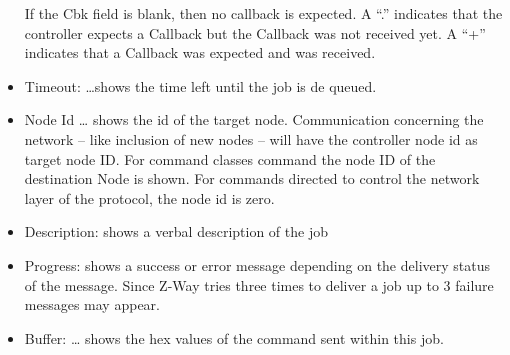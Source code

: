 \begin{itemize}
If the Cbk field is blank, then no callback is expected. A “.” indicates that the controller expects a Callback but the Callback was not received yet. A “+” indicates that a Callback was expected and was received.

\item Timeout: …shows the time left until the job is de queued.

\item Node Id … shows the id of the target node. Communication concerning the network – like inclusion of new nodes – will have the controller node id as target node ID. For command classes command the node ID of the destination Node is shown. For commands directed to control the network layer of the protocol, the node id is zero.
 
\item Description: shows a verbal description of the job

\item Progress: shows a success or error message depending on the delivery status of the message. Since Z-Way tries three times to deliver a job up to 3 failure messages may appear.

\item Buffer: … shows the hex values of the command sent within this job.
\end{itemize}



